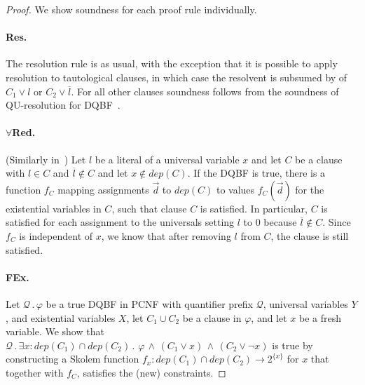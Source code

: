 \documentclass{svjour3}
\newcommand{\ldot}{\mathpunct{.}}
\newcommand{\dep}{\mathit{dep}}
\begin{document}
\begin{proof}
	We show soundness for each proof rule individually. 

\paragraph{\sf Res. }
The resolution rule is as usual, with the exception that it is possible to apply resolution to tautological clauses, in which case the resolvent is subsumed by of $C_1\vee l$ or $C_2\vee \overline{l}$. 
For all other clauses soundness follows from the soundness of QU-resolution for DQBF~\cite{Gelder/2012/QUResolution,BeyersdorffChewSchmidtSuda/2016/LiftingQBFResolutionCalculitoDQBF}.

\paragraph{\sf $\forall$Red. } (Similarly in~\cite{BalabanovChiangJiang/2014/ACertificationPerspectiveOfDQBF})
Let $l$ be a literal of a universal variable $x$ and let $C$ be a clause with $l\in C$ and $\overline{l}\notin C$ and let $x\notin \dep(C)$. 
If the DQBF is true, there is a function $f_C$ mapping assignments $\vec d$ to $\dep(C)$ to values $f_C(\vec d)$ for the existential variables in $C$, such that clause $C$ is satisfied. 
In particular, $C$ is satisfied for each assignment to the universals setting $l$ to 0 because $\overline{l}\notin C$. 
Since $f_C$ is independent of $x$, we know that after removing $l$ from $C$, the clause is still satisfied. %



\paragraph{\sf FEx. } 
Let $\mathcal Q\ldot\varphi$ be a true DQBF in PCNF with quantifier prefix $\mathcal Q$, universal variables $Y$, and existential variables $X$, let $C_1\cup C_2$ be a clause in $\varphi$, and let $x$ be a fresh variable. 
We show that $\mathcal Q\ldot \exists x: \dep(C_1)\cap\dep(C_2) \ldot\, \varphi \,\wedge\, (C_1\vee x)\,\wedge\, (C_2\vee \neg x)$ is true by constructing a Skolem function $f_x: \dep(C_1)\cap\dep(C_2)\to 2^{\{x\}}$ for $x$ that together with $f_C$, satisfies the (new) constraints.


\end{proof}
\end{document}

